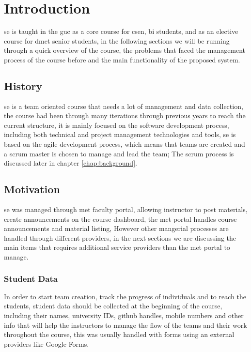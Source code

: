 \chapter{Introduction}
\label{chap:intro}

\ac{se} is taught in the \ac{guc} as a core course for \ac{csen}, \ac{bi} students, and as an elective course for \ac{dmet} senior students, in the following
sections we will be running through a quick overview of the course, the problems that faced the management process of the course before and the main
functionality of the proposed system.

\section{History}
\label{sec:history}
\ac{se} is a team oriented course that needs a lot of management and data collection, the course had been through many iterations through previous years
to reach the current structure, it is mainly focused on the software development process, including both technical and project management
technologies and tools, \ac{se} is based on the agile development process, which means that teams are created and a scrum master is chosen to manage
and lead the team; The scrum process is discussed later in chapter \ref{chap:background}.

\section{Motivation}
\label{sec:motivation}

\ac{se} was managed through \ac{met} faculty portal, allowing instructor to post materials,
create announcements on the course dashboard, the \ac{met} portal handles course announcements and material listing, However other
mangerial processes are handled through different providers, in the next sections we are discussing the main items that requires
additional service providers than the \ac{met} portal to manage.


\subsection{Student Data}
\label{sub:student-data}

In order to start team creation, track the progress of individuals and to reach the students, student data should be collected
at the beginning of the course, including their names, university IDs, github handles, mobile numbers and other info that will
help the instructors to manage the flow of the teams and their work throughout the course, this was usually handled with
forms using an external providers like Google Forms.

